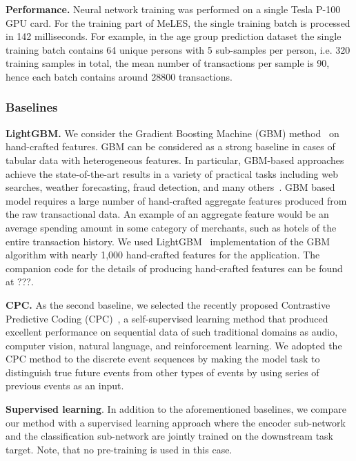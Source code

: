 \documentclass{article}
\begin{document}
\textbf{Performance.} Neural network training was performed on a single Tesla P-100 GPU card. For the training part of MeLES, the single training batch is processed in 142 milliseconds. For example, in the age group prediction dataset the single training batch contains 64 unique persons with 5 sub-samples per person, i.e. 320 training samples in total, the mean number of transactions per sample is 90, hence each batch contains around 28800 transactions.

\subsubsection{Baselines} \label{sec-baselines}


\textbf{LightGBM.} We consider the Gradient Boosting Machine (GBM) method~\cite{Friedman2001GreedyFA} on hand-crafted features. GBM can be considered as a strong baseline in cases of tabular data with heterogeneous features. In particular, GBM-based approaches achieve the state-of-the-art results in a variety of practical tasks including web searches, weather forecasting, fraud detection, and many others~\cite{Wu2009AdaptingBF, Vorobev2019LearningTS, Zhang2015AGB, Niu2019ACS}.
GBM based model requires a large number of hand-crafted aggregate features produced from the raw transactional data. An example of an aggregate feature would be an average spending amount in some category of merchants, such as hotels of the entire transaction history.
We used LightGBM~\cite{Ke2017LightGBMAH} implementation of the GBM algorithm with nearly 1,000 hand-crafted features for the application. The companion code for the details of producing hand-crafted features can be found at ???.

\textbf{CPC.} As the second baseline, we selected the recently proposed Contrastive Predictive Coding (CPC)~\cite{Oord2018RepresentationLW}, a self-supervised learning method that produced excellent performance on sequential data of such traditional domains as audio, computer vision, natural language, and reinforcement learning. We adopted the CPC method to the discrete event sequences by making the model task to distinguish true future events from other types of events by using series of previous events as an input.

\textbf{Supervised learning}. In addition to the aforementioned baselines, we compare our method with a supervised learning approach where the encoder sub-network and the classification sub-network are jointly trained on the downstream task target. Note, that no pre-training is used in this case.
\end{document}
